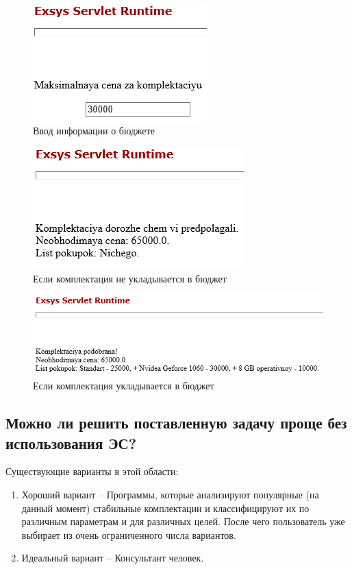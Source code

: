 \documentclass[14pt,a4paper,report]{report}
\begin{document}
\begin{figure}[h!]
	\centering
	\includegraphics[scale = 0.90]{images/6.png}
	\caption{Ввод информации о бюджете}
\end{figure}

\begin{figure}[h!]
	\centering
	\includegraphics[scale = 0.90]{images/7.png}
	\caption{Если комплектация не укладывается в бюджет}
\end{figure}

\begin{figure}[h!]
	\centering
	\includegraphics[scale = 0.90]{images/8.png}
	\caption{Если комплектация укладывается в бюджет}
\end{figure}

\subsection{Можно ли решить поставленную задачу проще без использования ЭС?}

Существующие варианты в этой области:

\begin{enumerate}
	\item Хороший вариант -- Программы, которые анализируют популярные (на данный момент) стабильные комплектации и классифицируют их по различным параметрам и для различных целей. После чего пользователь уже выбирает из очень ограниченного числа вариантов.
	\item Идеальный вариант -- Консультант человек. 
\end{enumerate}
\end{document}
